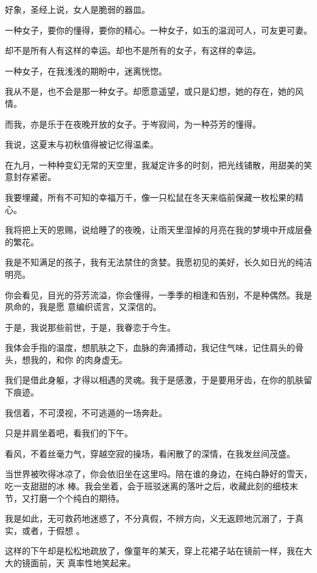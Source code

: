 \documentclass[12pt,a4paper]{article}
\def\blankrev{\vspace{1ex}}									%
\begin{document}
		好象，圣经上说，女人是脆弱的器皿。

		一种女子，要你的懂得，要你的精心。一种女子，如玉的温润可人，可友更可妻。

		却不是所有人有这样的幸运。却也不是所有的女子，有这样的幸运。

		一种女子，在我浅浅的期盼中，迷离恍惚。

		我从不是，也不会是那一种女子。却愿意遥望，或只是幻想，她的存在，她的风情。

		而我，亦是乐于在夜晚开放的女子。于岑寂间，为一种芬芳的懂得。

	\endwriting



		我说，这夏末与初秋值得被记忆得温柔。


		\blankrev
		在九月，一种种变幻无常的天空里，我凝定许多的时刻，把光线铺散，用甜美的笑意封存紧密。

		我要埋藏，所有不可知的幸福万千，像一只松鼠在冬天来临前保藏一枚松果的精心。

		我将把上天的恩赐，说给睡了的夜晚，让雨天里湿掉的月亮在我的梦境中开成层叠的繁花。

		我是不知满足的孩子，我有无法禁住的贪婪。我愿初见的美好，长久如日光的纯洁明亮。


		你会看见，目光的芬芳流溢，你会懂得，一季季的相逢和告别，不是种偶然。我是夙命的，我是愿
	意编织谎言，又深信的。

		于是，我说那些前世，于是，我眷恋于今生。

		我体会手指的温度，想肌肤之下，血脉的奔涌搏动，我记住气味，记住肩头的骨头，想我的，和你
	的肉身虚无。

		我们是借此身躯，才得以相遇的灵魂。我于是感激，于是要用牙齿，在你的肌肤留下痕迹。

		我信着，不可漠视，不可逃遁的一场奔赴。


		\blankrev
		只是并肩坐着吧，看我们的下午。

		看风，不着丝毫力气，穿越空寂的操场，看闲散了的深情，在我发丝间茂盛。

		当世界被吹得冰凉了，你会依旧坐在这里吗。陪在谁的身边，在纯白静好的雪天，吃一支甜甜的冰
	棒。我会坐着，会于班驳迷离的落叶之后，收藏此刻的细枝末节，又打磨一个个纯白的期待。

		我是如此，无可救药地迷惑了，不分真假，不辨方向，义无返顾地沉溺了，于真实，或者，于假想
	。

		这样的下午却是松松地疏放了，像童年的某天，穿上花裙子站在镜前一样，我在大大的镜面前，天
	真率性地笑起来。
\end{document}
